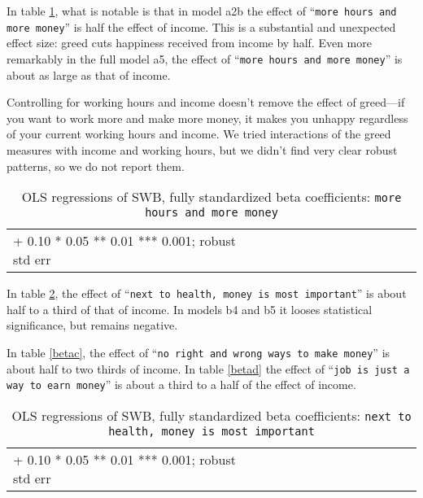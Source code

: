 \documentclass[10pt, letterpaper]{article}
\begin{document}
\begin{spacing}{1.8}
In table \ref{betaa}, what is notable is that in model a2b the effect of ``\texttt{more hours and more money}'' is half the effect of income. This is a substantial and unexpected effect size: greed cuts happiness received from income by half. Even more remarkably in the full model a5, the effect of ``\texttt{more hours and more money}'' is about as large as that of income.

Controlling for working hours and income doesn't remove the effect of greed---if you want to work more and make more money, it makes you unhappy regardless of your current working hours and
income. {We tried interactions of the greed measures with income and working hours, but we didn't find very clear robust patterns, so we do not report them.}


\begin{spacing}{.9} \begin{table}[H]\centering   \begin{scriptsize} \begin{tabular}{p{2.3in}p{.5in}p{.5in}p{.5in}p{.5in}p{.5in}p{.5in}p{.5in}p{.5in}p{.5in}p{.5 in}p{.5in}p{.5 in}}\hline  \hline + 0.10 * 0.05 ** 0.01 *** 0.001; robust std err \end{tabular}\end{scriptsize}\caption{\label{betaa}OLS regressions of SWB, fully standardized beta coefficients: \texttt{more hours and more money}}\end{table} \end{spacing}
 
In table \ref{betab}, the effect of ``\texttt{next to  health, money is most
  important}'' is about half to a third of that of income. In models b4 and b5 it looses statistical significance, but remains negative. 

In table \ref{betac}, the effect of ``\texttt{no right  and wrong ways to make money}'' is about half to two thirds of income. In table \ref{betad} the effect of ``\texttt{job is just a way to earn money}'' is about a third to a half of the effect of income.

\begin{spacing}{.9} \begin{table}[H]\centering   \begin{scriptsize} \begin{tabular}{p{1.8in}p{.5in}p{.5in}p{.5in}p{.5in}p{.5in}p{.5in}p{.5in}p{.5in}p{.5in}p{.5 in}p{.5in}p{.5 in}}\hline  \hline + 0.10 * 0.05 ** 0.01 *** 0.001; robust std err \end{tabular}\end{scriptsize}\caption{\label{betab}OLS regressions of SWB, fully standardized beta coefficients: \texttt{next to  health, money is most  important}}\end{table} \end{spacing}


\end{spacing}
\end{document}
